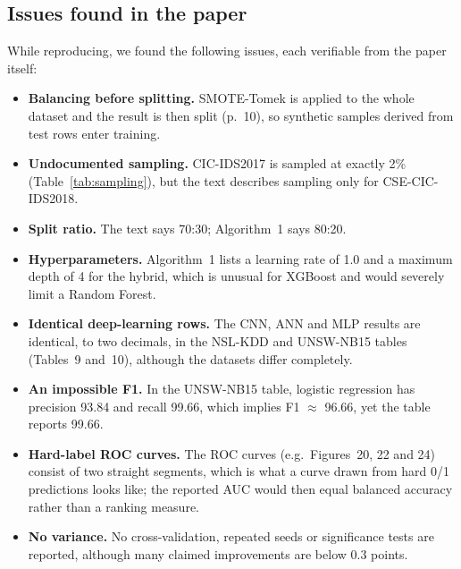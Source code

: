 \documentclass[11pt,a4paper]{article}
\begin{document}
\subsection{Issues found in the paper}
\label{sec:issues}
While reproducing, we found the following issues, each verifiable from the paper itself:
\begin{itemize}
  \item \textbf{Balancing before splitting.} SMOTE-Tomek is applied to the whole dataset and the result is then
        split (p.~10), so synthetic samples derived from test rows enter training.
  \item \textbf{Undocumented sampling.} CIC-IDS2017 is sampled at exactly 2\% (Table~\ref{tab:sampling}), but the
        text describes sampling only for CSE-CIC-IDS2018.
  \item \textbf{Split ratio.} The text says 70:30; Algorithm~1 says 80:20.
  \item \textbf{Hyperparameters.} Algorithm~1 lists a learning rate of 1.0 and a maximum depth of 4 for the hybrid,
        which is unusual for XGBoost and would severely limit a Random Forest.
  \item \textbf{Identical deep-learning rows.} The CNN, ANN and MLP results are identical, to two decimals, in the
        NSL-KDD and UNSW-NB15 tables (Tables~9 and~10), although the datasets differ completely.
  \item \textbf{An impossible F1.} In the UNSW-NB15 table, logistic regression has precision 93.84 and recall 99.66,
        which implies F1 $\approx$ 96.66, yet the table reports 99.66.
  \item \textbf{Hard-label ROC curves.} The ROC curves (e.g.\ Figures~20, 22 and 24) consist of two straight
        segments, which is what a curve drawn from hard 0/1 predictions looks like; the reported AUC would then equal
        balanced accuracy rather than a ranking measure.
  \item \textbf{No variance.} No cross-validation, repeated seeds or significance tests are reported, although many
        claimed improvements are below 0.3 points.
\end{itemize}

\end{document}
